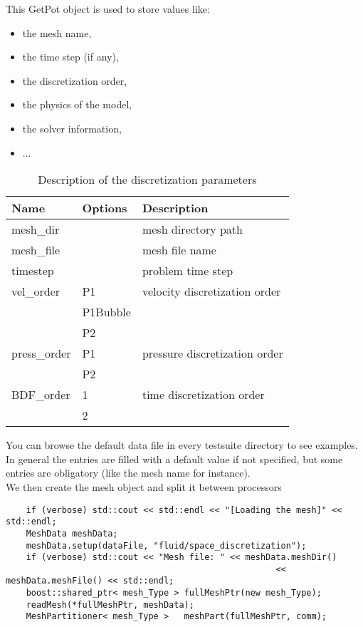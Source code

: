 \noindent This GetPot object is used to store values like:
\begin{itemize}
\item the mesh name,
\item the time step (if any),
\item the discretization order,
\item the physics of the model,
\item the solver information,
\item ...
\end{itemize}

\begin{table}
\begin{center}
\begin{tabular}{|l|l|l|}
\hline
Name & Options & Description \\
\hline \hline
mesh\_dir & & mesh directory path \\ \hline
mesh\_file & & mesh file name \\ \hline
timestep & & problem time step \\ \hline
vel\_order & P1 & velocity discretization order \\ \
& P1Bubble & \\
& P2 & \\ \hline
press\_order & P1 & pressure discretization order \\
& P2 & \\ \hline
BDF\_order & 1 & time discretization order \\
& 2 & \\ \hline
\end{tabular}
\end{center}
\caption{Description of the discretization parameters
}
\label{table-bcparams}
\end{table}

You can browse the default data file in every testsuite directory to see examples.
In general the entries
are filled with a default value if not specified,
but some entries are obligatory (like the mesh name for instance). \\
 We then create the mesh object and split it between processors

\begin{verbatim}
    if (verbose) std::cout << std::endl << "[Loading the mesh]" << std::endl;
    MeshData meshData;
    meshData.setup(dataFile, "fluid/space_discretization");
    if (verbose) std::cout << "Mesh file: " << meshData.meshDir() 
    					                             << meshData.meshFile() << std::endl;
    boost::shared_ptr< mesh_Type > fullMeshPtr(new mesh_Type);
    readMesh(*fullMeshPtr, meshData);
    MeshPartitioner< mesh_Type >   meshPart(fullMeshPtr, comm);
\end{verbatim}


